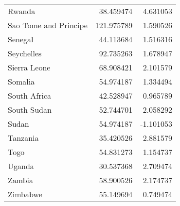 \begin{tabular}{lrr}
Rwanda                   &                         38.459474 &                                4.631053 \\
Sao Tome and Principe    &                        121.975789 &                                1.590526 \\
Senegal                  &                         44.113684 &                                1.516316 \\
Seychelles               &                         92.735263 &                                1.678947 \\
Sierra Leone             &                         68.908421 &                                2.101579 \\
Somalia                  &                         54.974187 &                                1.334494 \\
South Africa             &                         42.528947 &                                0.965789 \\
South Sudan              &                         52.744701 &                               -2.058292 \\
Sudan                    &                         54.974187 &                               -1.101053 \\
Tanzania                 &                         35.420526 &                                2.881579 \\
Togo                     &                         54.831273 &                                1.154737 \\
Uganda                   &                         30.537368 &                                2.709474 \\
Zambia                   &                         58.900526 &                                2.174737 \\
Zimbabwe                 &                         55.149694 &                                0.749474 \\
\bottomrule
\end{tabular}
